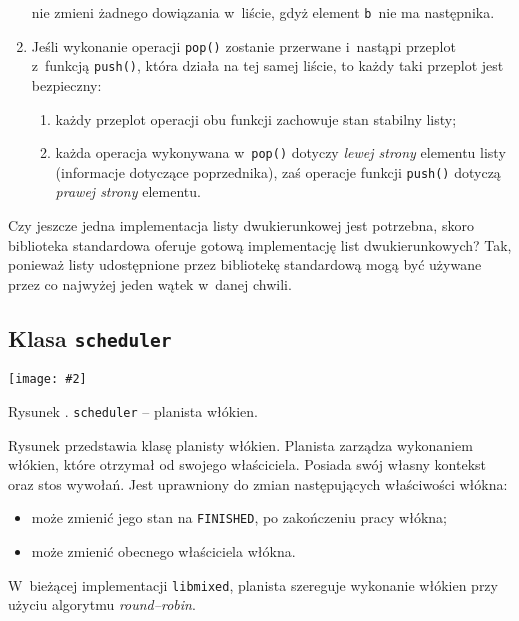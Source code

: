\documentclass[12pt]{mwart}
\newcommand{\code}{\texttt}
\newcommand{\procbr}{()}
\newcommand{\function}[1]{\code{#1\procbr}}
\newcounter{figmain}
\newcommand{\myownfigure}[4]{ \newcounter{#1} \setcounter{#1}{\value{figmain}} \addtocounter{figmain}{1} \begin{center} \label{fig:#1} \centering \texttt{[image: \#2]}\\ \nopagebreak[5] \parbox[t]{11.5cm}{Rysunek \arabic{#1}. #3.} \end{center}}
\begin{document}
\begin{enumerate}
    nie zmieni żadnego dowiązania w~liście, gdyż element \code{b}~nie ma następnika.
    \item Jeśli wykonanie operacji \function{pop} zostanie przerwane i~nastąpi przeplot z~funkcją \function{push}, która działa na tej samej liście,
    to każdy taki przeplot jest bezpieczny:
    \begin{enumerate}
      \item każdy przeplot operacji obu funkcji zachowuje stan stabilny listy;
      \item każda operacja wykonywana w~\function{pop} dotyczy \emph{lewej strony} elementu listy (informacje dotyczące poprzednika), zaś
      operacje funkcji \function{push} dotyczą \emph{prawej strony} elementu.
    \end{enumerate}
  \end{enumerate}
\par
\indent
  Czy jeszcze jedna implementacja listy dwukierunkowej jest potrzebna, skoro biblioteka standardowa
  oferuje gotową implementację list dwukierunkowych? Tak, ponieważ listy
  udostępnione przez bibliotekę standardową mogą być używane przez co najwyżej jeden wątek w~danej chwili.
\par
%
\newpage
\subsection{Klasa \code{scheduler}}
\myownfigure{Scheduler}{Scheduler.png}{\code{scheduler} -- planista włókien}{.7}
\indent
  Rysunek  przedstawia klasę planisty włókien.
  Planista zarządza wykonaniem włókien, które otrzymał od swojego właściciela.
  Posiada swój własny kontekst oraz stos wywołań. Jest uprawniony do zmian następujących właściwości włókna:
  \begin{itemize}
    \item może zmienić jego stan na \code{FINISHED}, po zakończeniu pracy włókna;
    \item może zmienić obecnego właściciela włókna.
  \end{itemize}
\par
%
\indent
  W~bieżącej implementacji \code{libmixed}, planista szereguje wykonanie włókien przy użyciu algorytmu \emph{round--robin}.
\par
%
\newpage
\end{document}
